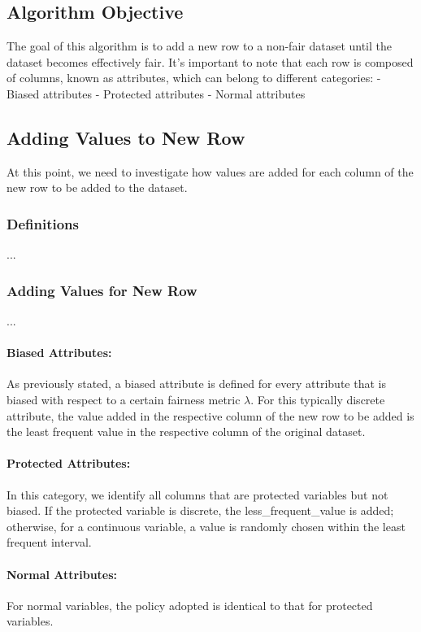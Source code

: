 \documentclass{article}
\begin{document}
\subsection{Algorithm Objective}
The goal of this algorithm is to add a new row to a non-fair dataset until the dataset becomes effectively fair. It's important to note that each row is composed of columns, known as attributes, which can belong to different categories:
- Biased attributes
- Protected attributes
- Normal attributes

\subsection{Adding Values to New Row}
At this point, we need to investigate how values are added for each column of the new row to be added to the dataset.

\subsubsection{Definitions}
...

\subsubsection{Adding Values for New Row}
...

\paragraph{Biased Attributes:}
As previously stated, a biased attribute is defined for every attribute that is biased with respect to a certain fairness metric \( \lambda \). For this typically discrete attribute, the value added in the respective column of the new row to be added is the least frequent value in the respective column of the original dataset.

\paragraph{Protected Attributes:}
In this category, we identify all columns that are protected variables but not biased. If the protected variable is discrete, the less\_frequent\_value is added; otherwise, for a continuous variable, a value is randomly chosen within the least frequent interval.

\paragraph{Normal Attributes:}
For normal variables, the policy adopted is identical to that for protected variables.
\end{document}

